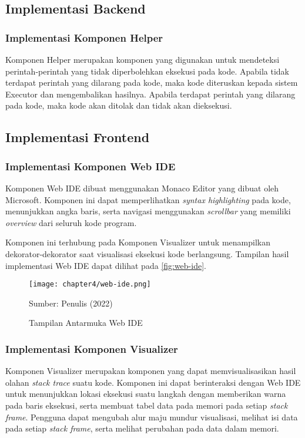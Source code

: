 
\subsection{Implementasi Backend}
\subsubsection{Implementasi Komponen Helper}
Komponen Helper merupakan komponen yang digunakan untuk mendeteksi perintah-perintah yang tidak diperbolehkan eksekusi pada kode. Apabila tidak terdapat perintah yang dilarang pada kode, maka kode diteruskan kepada sistem Executor dan mengembalikan hasilnya. Apabila terdapat perintah yang dilarang pada kode, maka kode akan ditolak dan tidak akan dieksekusi.


\subsection{Implementasi Frontend}

\subsubsection{Implementasi Komponen Web IDE}
Komponen Web IDE dibuat menggunakan Monaco Editor yang dibuat oleh Microsoft. Komponen ini dapat memperlihatkan \textit{syntax highlighting} pada kode, menunjukkan angka baris, serta navigasi menggunakan \textit{scrollbar} yang memiliki \textit{overview} dari seluruh kode program.

Komponen ini terhubung pada Komponen Visualizer untuk menampilkan dekorator-dekorator saat visualisasi eksekusi kode berlangsung. Tampilan hasil implementasi Web IDE dapat dilihat pada \autoref{fig:web-ide}.

\begin{figure}[H]
  \centering
  \texttt{[image: chapter4/web-ide.png]}
  \caption{Tampilan Antarmuka Web IDE} \label{fig:web-ide}
  Sumber: Penulis (2022)
\end{figure}

\subsubsection{Implementasi Komponen Visualizer}
Komponen Visualizer merupakan komponen yang dapat memvisualisasikan hasil olahan \textit{stack trace} suatu kode. Komponen ini dapat berinteraksi dengan Web IDE untuk menunjukkan lokasi eksekusi suatu langkah dengan memberikan warna pada baris eksekusi, serta membuat tabel data pada memori pada setiap \textit{stack frame}. Pengguna dapat mengubah alur maju mundur visualisasi, melihat isi data pada setiap \textit{stack frame}, serta melihat perubahan pada data dalam memori.

